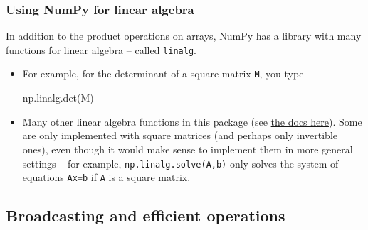 \documentclass{beamer}
\theoremstyle{example}
\newcommand{\ct}[1]{\lstinline[language=Python,basicstyle=\ttfamily\footnotesize,stringstyle=\small\color{strings}]!#1!}
\begin{document}
\begin{frame}
\frametitle{Using NumPy for linear algebra}
In addition to the product operations on arrays, NumPy has a library with many functions for linear algebra {--} called \ct{linalg}. 

\pause
\begin{itemize}
	\item For example, for the determinant of a square matrix \ct{M}, you type 
        \begin{center}
            np.linalg.det(M)
        \end{center}
    \pause
    \item Many other linear algebra functions in this package (see \href{https://numpy.org/doc/stable/reference/routines.linalg.html}{the docs here}). \newline 
Some are only implemented with square matrices (and perhaps only invertible ones), even though it would make sense to implement them in more general settings {--} for example, \ct{np.linalg.solve(A,b)} only solves the system of equations \ct{Ax=b} if \ct{A} is a square matrix.
\end{itemize}

\end{frame}

\subsection{Broadcasting and efficient operations}
\end{document}
